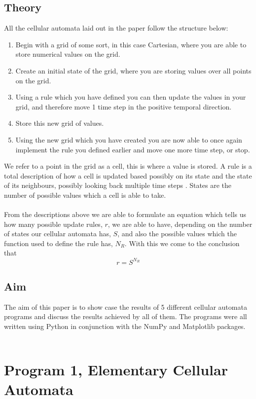 \documentclass{article}
\begin{document}
\subsection{Theory}
All the cellular automata laid out in the paper follow the structure below:\\
\begin{enumerate}
  \item Begin with a grid of some sort, in this case Cartesian, where you are able to store numerical values on the grid.
  \item Create an initial state of the grid, where you are storing values over all points on the grid.
  \item Using a rule which you have defined you can then update the values in your grid, and therefore move 1 time step in the positive temporal direction.
  \item Store this new grid of values.
  \item Using the new grid which you have created you are now able to once again implement the rule you defined earlier and move one more time step, or stop.
\end{enumerate}
We refer to a point in the grid as a cell, this is where a value is stored. A rule is a total description of how a cell is updated based possibly on its state and the state of its neighbours, possibly looking back multiple time steps \cite{proj}. States are the number of possible values which a cell is able to take.\\
\\
From the descriptions above we are able to formulate an equation which tells us how many possible update rules, $r$, we are able to have, depending on the number of states our cellular automata has, $S$, and also the possible values which the function used to define the rule has, $N_R$. With this we come to the conclusion that
\begin{equation}\label{eqn1}
    r = S^{N_R}
\end{equation}
\subsection{Aim}
The aim of this paper is to show case the results of 5 different cellular automata programs and discuss the results achieved by all of them. The programs were all written using Python in conjunction with the NumPy \cite{numpy} and Matplotlib \cite{matplot} packages.\\
\\
\section{Program 1, Elementary Cellular Automata}
\end{document}
